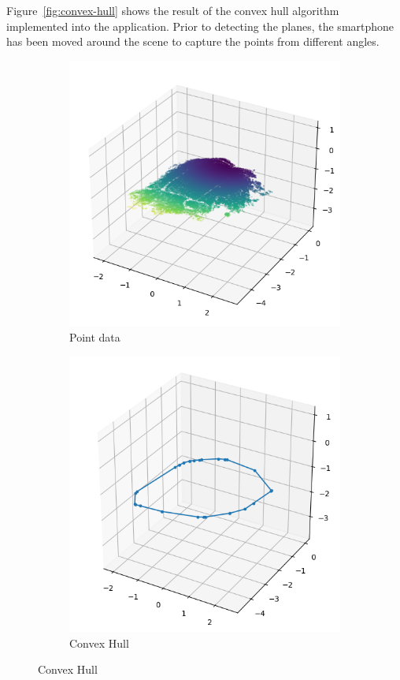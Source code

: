Figure~\ref{fig:convex-hull} shows the result of the convex hull algorithm implemented into the application.
Prior to detecting the planes, the smartphone has been moved around the scene to capture the points from different angles.

\begin{figure}[h!tp]

    \centering
    \begin{subfigure}[b]{0.4\textwidth}
        \centering
        \includegraphics[width=\linewidth]{python/plots/hull/points}
        \caption{Point data}
    \end{subfigure}%
    \begin{subfigure}[b]{0.4\textwidth}
        \centering
        \includegraphics[width=\linewidth]{python/plots/hull/hull}
        \caption{Convex Hull}
    \end{subfigure}%


\end{figure}
